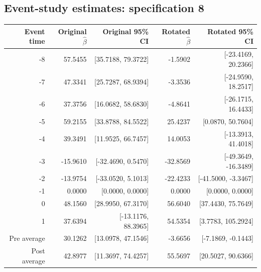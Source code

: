 \documentclass[10pt]{article}
\begin{document}
\subsection*{Event-study estimates: specification 8}
\begin{center}\scriptsize
\begin{tabular}{r rr rr}
\toprule
Event time & Original $\hat\beta$ & Original 95\% CI & Rotated $\hat\beta$ & Rotated 95\% CI \\
\midrule
-8 & 57.5455 & [35.7188, 79.3722] & -1.5902 & [-23.4169, 20.2366] \\
-7 & 47.3341 & [25.7287, 68.9394] & -3.3536 & [-24.9590, 18.2517] \\
-6 & 37.3756 & [16.0682, 58.6830] & -4.8641 & [-26.1715, 16.4433] \\
-5 & 59.2155 & [33.8788, 84.5522] & 25.4237 & [0.0870, 50.7604] \\
-4 & 39.3491 & [11.9525, 66.7457] & 14.0053 & [-13.3913, 41.4018] \\
-3 & -15.9610 & [-32.4690, 0.5470] & -32.8569 & [-49.3649, -16.3489] \\
-2 & -13.9754 & [-33.0520, 5.1013] & -22.4233 & [-41.5000, -3.3467] \\
-1 & 0.0000 & [0.0000, 0.0000] & 0.0000 & [0.0000, 0.0000] \\
0 & 48.1560 & [28.9950, 67.3170] & 56.6040 & [37.4430, 75.7649] \\
1 & 37.6394 & [-13.1176, 88.3965] & 54.5354 & [3.7783, 105.2924] \\
\midrule
Pre average & 30.1262 & [13.0978, 47.1546] & -3.6656 & [-7.1869, -0.1443] \\
Post average & 42.8977 & [11.3697, 74.4257] & 55.5697 & [20.5027, 90.6366] \\
\bottomrule
\end{tabular}
\end{center}
\clearpage
\end{document}
